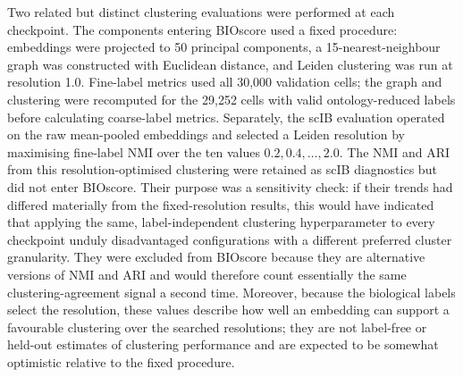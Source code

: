 \documentclass[11pt]{article}
\begin{document}
Two related but distinct clustering evaluations were performed at each checkpoint.
The components entering BIOscore used a fixed procedure: embeddings were projected to 50 principal components, a 15-nearest-neighbour graph was constructed with Euclidean distance, and Leiden clustering was run at resolution 1.0.
Fine-label metrics used all 30,000 validation cells; the graph and clustering were recomputed for the 29,252 cells with valid ontology-reduced labels before calculating coarse-label metrics.
Separately, the scIB evaluation operated on the raw mean-pooled embeddings and selected a Leiden resolution by maximising fine-label NMI over the ten values \(0.2, 0.4, \ldots, 2.0\).
The NMI and ARI from this resolution-optimised clustering were retained as scIB diagnostics but did not enter BIOscore.
Their purpose was a sensitivity check: if their trends had differed materially from the fixed-resolution results, this would have indicated that applying the same, label-independent clustering hyperparameter to every checkpoint unduly disadvantaged configurations with a different preferred cluster granularity.
They were excluded from BIOscore because they are alternative versions of NMI and ARI and would therefore count essentially the same clustering-agreement signal a second time.
Moreover, because the biological labels select the resolution, these values describe how well an embedding can support a favourable clustering over the searched resolutions; they are not label-free or held-out estimates of clustering performance and are expected to be somewhat optimistic relative to the fixed procedure.
\end{document}
